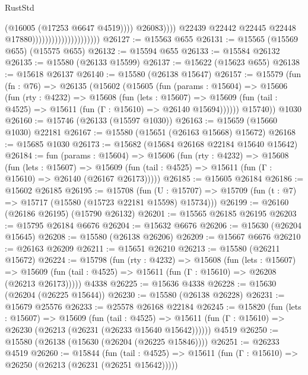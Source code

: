\begin{lexlean}{RustStd}
\begin{coremodule}
                                                          (@16005 (@17253 @6647 @4519))))
                                                      @26083))))
                                              @22439
                                              @22442
                                              @22445
                                              @22448
                                              @17880)))))))))))))))))))))
@26127 := @15563 @655
@26131 := @15565 (@15569 @655) (@15575 @655)
@26132 := @15594 @655
@26133 := @15584 @26132
@26135 := @15580 (@26133 @15599)
@26137 := @15622 (@15623 @655)
@26138 := @15618 @26137
@26140 := @15580 (@26138 @15647)
@26157 := @15579
    (fun (fn : @76) =>
    @26135
      (@15602
        (@15605
          (fun (params : @15604) =>
          @15606
            (fun (rty : @4232) =>
            @15608
              (fun (lets : @15607) =>
              @15609 (fun (tail : @4525) => @15611 (fun (Γ : @15610) => @26140 @15694))))))
        @15740))
    @1030
@26160 := @15746 (@26133 (@15597 @1030))
@26163 := @15659 (@15660 @1030) @22181
@26167 := @15580 (@15651 (@26163 @15668) @15672)
@26168 := @15685 @1030
@26173 := @15682 (@15684 @26168 @22184 @15640 @15642)
@26184 := fun (params : @15604) =>
  @15606
    (fun (rty : @4232) =>
    @15608
      (fun (lets : @15607) =>
      @15609 (fun (tail : @4525) => @15611 (fun (Γ : @15610) => @26140 (@26167 @26173)))))
@26185 := @15605 @26184
@26186 := @15602 @26185
@26195 := @15708
    (fun (U : @15707) => @15709 (fun (t : @7) => @15717 (@15580 (@15723 @22181 @15598) @15734)))
@26199 := @26160 (@26186 @26195) (@15790 @26132)
@26201 := @15565 @26185 @26195
@26203 := @15795 @26184 @6676
@26204 := @15632 @6676
@26206 := @15630 (@26204 @15645)
@26208 := @15580 (@26138 @26206)
@26209 := @15667 @6676
@26210 := @26163 @26209
@26211 := @15651 @26210
@26213 := @15580 (@26211 @15672)
@26224 := @15798
    (fun (rty : @4232) =>
    @15608
      (fun (lets : @15607) =>
      @15609 (fun (tail : @4525) => @15611 (fun (Γ : @15610) => @26208 (@26213 @26173)))))
    @4338
@26225 := @15636 @4338
@26228 := @15630 (@26204 (@26225 @15644))
@26230 := @15580 (@26138 @26228)
@26231 := @15679 @25576
@26233 := @25578 @26168 @22184
@26245 := @15820
    (fun (lets : @15607) =>
    @15609
      (fun (tail : @4525) =>
      @15611 (fun (Γ : @15610) => @26230 (@26213 (@26231 (@26233 @15640 @15642))))))
    @4519
@26250 := @15580 (@26138 (@15630 (@26204 (@26225 @15846))))
@26251 := @26233 @4519
@26260 := @15844
    (fun (tail : @4525) => @15611 (fun (Γ : @15610) => @26250 (@26213 (@26231 (@26251 @15642)))))

\end{coremodule}
\end{lexlean}
